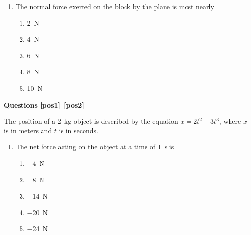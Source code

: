 \documentclass{../../oss-apphys}
\begin{document}
\begin{multicols}{2}
\begin{enumerate}[resume,leftmargin=18pt]
  \item The normal force exerted on the block by the plane is most nearly
    \begin{enumerate}[noitemsep,topsep=0pt,leftmargin=18pt,label=(\Alph*)]
    \item\SI{2}{\newton}
    \item\SI{4}{\newton}
    \item\SI{6}{\newton}
    \item\SI{8}{\newton}
    \item\SI{10}{\newton}
    \end{enumerate}
    \label{plane2}
  \end{enumerate}
  
  \textbf{Questions \ref{pos1}--\ref{pos2}}

  The position of a \SI{2}{\kilo\gram} object is described by the equation
  $x=2t^2-3t^3$, where $x$ is in meters and $t$ is in seconds.
  \begin{enumerate}[resume,leftmargin=18pt]
  \item The net force acting on the object at a time of \SI{1}{s} is
    \begin{enumerate}[noitemsep,topsep=0pt,leftmargin=18pt,label=(\Alph*)]
    \item\SI{-4}{\newton}
    \item\SI{-8}{\newton}
    \item\SI{-14}{\newton}
    \item\SI{-20}{\newton}
    \item\SI{-24}{\newton}
    \end{enumerate}
    \label{pos1}
    

\end{enumerate}
\end{multicols}
\end{document}
